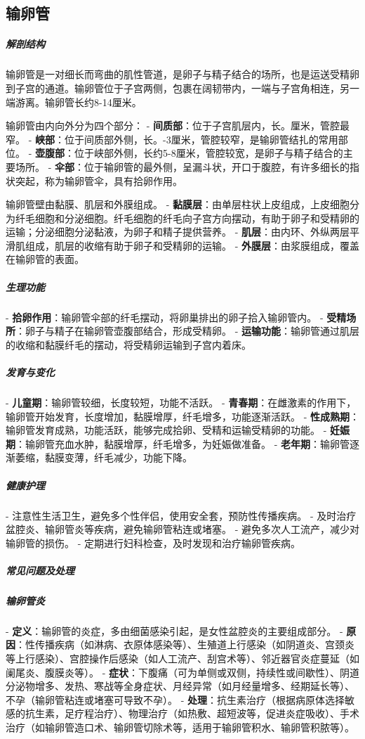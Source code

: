 \begin{enumerate}
\subsection{输卵管}

\subparagraph{解剖结构}
输卵管是一对细长而弯曲的肌性管道，是卵子与精子结合的场所，也是运送受精卵到子宫的通道。输卵管位于子宫两侧，包裹在阔韧带内，一端与子宫角相连，另一端游离。输卵管长约8-14厘米。

输卵管由内向外分为四个部分：
- \textbf{间质部}：位于子宫肌层内，长。厘米，管腔最窄。
- \textbf{峡部}：位于间质部外侧，长。-3厘米，管腔较窄，是输卵管结扎的常用部位。
- \textbf{壶腹部}：位于峡部外侧，长约5-8厘米，管腔较宽，是卵子与精子结合的主要场所。
- \textbf{伞部}：位于输卵管的最外侧，呈漏斗状，开口于腹腔，有许多细长的指状突起，称为输卵管伞，具有拾卵作用。

输卵管壁由黏膜、肌层和外膜组成。
- \textbf{黏膜层}：由单层柱状上皮组成，上皮细胞分为纤毛细胞和分泌细胞。纤毛细胞的纤毛向子宫方向摆动，有助于卵子和受精卵的运输；分泌细胞分泌黏液，为卵子和精子提供营养。
- \textbf{肌层}：由内环、外纵两层平滑肌组成，肌层的收缩有助于卵子和受精卵的运输。
- \textbf{外膜层}：由浆膜组成，覆盖在输卵管的表面。

\subparagraph{生理功能}
- \textbf{拾卵作用}：输卵管伞部的纤毛摆动，将卵巢排出的卵子拾入输卵管内。
- \textbf{受精场所}：卵子与精子在输卵管壶腹部结合，形成受精卵。
- \textbf{运输功能}：输卵管通过肌层的收缩和黏膜纤毛的摆动，将受精卵运输到子宫内着床。

\subparagraph{发育与变化}
- \textbf{儿童期}：输卵管较细，长度较短，功能不活跃。
- \textbf{青春期}：在雌激素的作用下，输卵管开始发育，长度增加，黏膜增厚，纤毛增多，功能逐渐活跃。
- \textbf{性成熟期}：输卵管发育成熟，功能活跃，能够完成拾卵、受精和运输受精卵的功能。
- \textbf{妊娠期}：输卵管充血水肿，黏膜增厚，纤毛增多，为妊娠做准备。
- \textbf{老年期}：输卵管逐渐萎缩，黏膜变薄，纤毛减少，功能下降。

\subparagraph{健康护理}
- 注意性生活卫生，避免多个性伴侣，使用安全套，预防性传播疾病。
- 及时治疗盆腔炎、输卵管炎等疾病，避免输卵管粘连或堵塞。
- 避免多次人工流产，减少对输卵管的损伤。
- 定期进行妇科检查，及时发现和治疗输卵管疾病。

\subparagraph{常见问题及处理}

\subparagraph{输卵管炎}
- \textbf{定义}：输卵管的炎症，多由细菌感染引起，是女性盆腔炎的主要组成部分。
- \textbf{原因}：性传播疾病（如淋病、衣原体感染等）、生殖道上行感染（如阴道炎、宫颈炎等上行感染）、宫腔操作后感染（如人工流产、刮宫术等）、邻近器官炎症蔓延（如阑尾炎、腹膜炎等）。
- \textbf{症状}：下腹痛（可为单侧或双侧，持续性或间歇性）、阴道分泌物增多、发热、寒战等全身症状、月经异常（如月经量增多、经期延长等）、不孕（输卵管粘连或堵塞可导致不孕）。
- \textbf{处理}：抗生素治疗（根据病原体选择敏感的抗生素，足疗程治疗）、物理治疗（如热敷、超短波等，促进炎症吸收）、手术治疗（如输卵管造口术、输卵管切除术等，适用于输卵管积水、输卵管积脓等）。


\end{enumerate}
